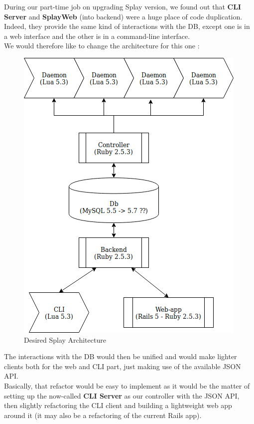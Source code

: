 \documentclass{article}
\begin{document}
  During our part-time job on upgrading Splay version, we found out
  that \textbf{CLI Server} and \textbf{SplayWeb} (into backend) were a huge place
  of code duplication. Indeed, they provide the same kind of interactions
  with the DB, except one is in a web interface and the other is in a
  command-line interface.\\

  We would therefore like to change the architecture for this one : \\

  \begin{figure}[H]
   \caption{\label{new_arch} Desired Splay Architecture}
   \centering
   \includegraphics[scale=0.6]{images/NewSplay.png}
  \end{figure}

  The interactions with the DB would then be unified and would make
  lighter clients both for the web and CLI part, just making use of
  the available JSON API.\\

  Basically, that refactor would be easy to implement as it would be the
  matter of setting up the now-called \textbf{CLI Server} as our
  controller with the JSON API, then slightly refactoring the CLI client
  and building a lightweight web app around it (it may also be a refactoring
  of the current Rails app).\\
\end{document}
